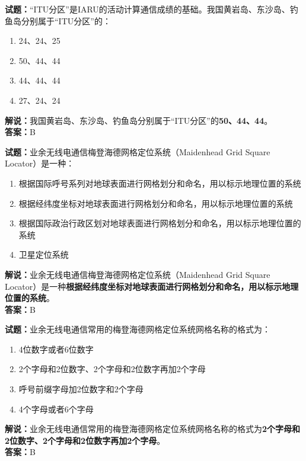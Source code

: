 \documentclass{ctexbook}
\begin{document}
\bigskip


\noindent\textbf{试题：}“ITU分区”是IARU的活动计算通信成绩的基础。我国黄岩岛、东沙岛、钓鱼岛分别属于“ITU分区”的：
\begin{enumerate}[leftmargin=3em]
\item 24、24、25
\item 50、44、44
\item 44、44、44
\item 27、24、24
\end{enumerate}
\noindent\textbf{解说：}我国黄岩岛、东沙岛、钓鱼岛分别属于“ITU分区”的\textbf{50、44、44}。\\\noindent\textbf{答案：}B




\bigskip


\noindent\textbf{试题：}业余无线电通信梅登海德网格定位系统（Maidenhead Grid Square Locator）是一种：
\begin{enumerate}[leftmargin=3em]
\item 根据国际呼号系列对地球表面进行网格划分和命名，用以标示地理位置的系统
\item 根据经纬度坐标对地球表面进行网格划分和命名，用以标示地理位置的系统
\item 根据国际政治行政区划对地球表面进行网格划分和命名，用以标示地理位置的系统
\item 卫星定位系统
\end{enumerate}
\noindent\textbf{解说：}业余无线电通信梅登海德网格定位系统（Maidenhead Grid Square Locator）是一种\textbf{根据经纬度坐标对地球表面进行网格划分和命名，用以标示地理位置的系统}。\\\noindent\textbf{答案：}B



\bigskip


\noindent\textbf{试题：}业余无线电通信常用的梅登海德网格定位系统网格名称的格式为：
\begin{enumerate}[leftmargin=3em]
\item 4位数字或者6位数字
\item 2个字母和2位数字、2个字母和2位数字再加2个字母
\item 呼号前缀字母加2位数字和2个字母
\item 4个字母或者6个字母
\end{enumerate}
\noindent\textbf{解说：}业余无线电通信常用的梅登海德网格定位系统网格名称的格式为\textbf{2个字母和2位数字、2个字母和2位数字再加2个字母}。\\\noindent\textbf{答案：}B
\end{document}
